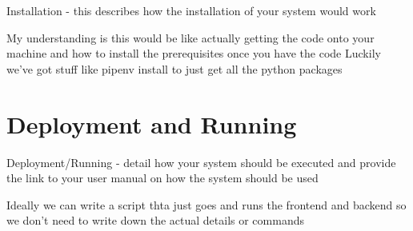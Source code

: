 \documentclass{article}
\begin{document}
Installation - this describes how the installation of your system would work

My understanding is this would be like actually getting the code onto your machine and how to install the prerequisites once you have the code
Luckily we've got stuff like pipenv install to just get all the python packages


\section{Deployment and Running}
Deployment/Running - detail how your system should be executed and provide the link to your user
manual on how the system should be used

Ideally we can write a script thta just goes and runs the frontend and backend so we don't need to write down the actual details or commands
\end{document}
